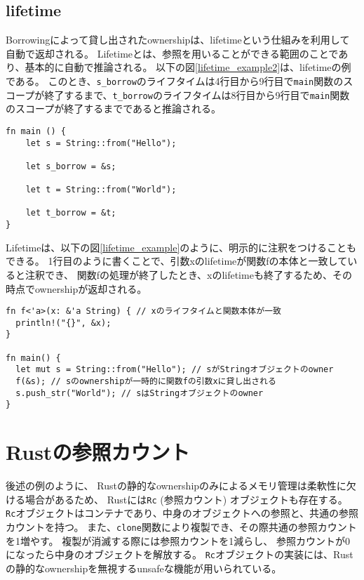 \documentclass{sumiilab-paper}
\theoremstyle{mystyle}
\numberwithin{definition}{chapter} %
\begin{document}
\subsection{lifetime}
Borrowingによって貸し出されたownershipは、lifetimeという仕組みを利用して自動で返却される。
Lifetimeとは、参照を用いることができる範囲のことであり、基本的に自動で推論される。
以下の図\ref{lifetime_example2}は、lifetimeの例である。
このとき、\texttt{s\_borrow}のライフタイムは4行目から9行目で\texttt{main}関数のスコープが終了するまで、\texttt{t\_borrow}のライフタイムは8行目から9行目で\texttt{main}関数のスコープが終了するまでであると推論される。
\begin{lstlisting}[caption=Lifetimeの例, label=lifetime_example2, captionpos=b]
fn main () {
    let s = String::from("Hello");

    let s_borrow = &s;

    let t = String::from("World");

    let t_borrow = &t;
}
\end{lstlisting}
Lifetimeは、以下の図\ref{lifetime_example}のように、明示的に注釈をつけることもできる。
1行目のように書くことで、引数xのlifetimeが関数fの本体と一致していると注釈でき、
関数fの処理が終了したとき、xのlifetimeも終了するため、その時点でownershipが返却される。
\begin{lstlisting}[caption=Lifetime注釈, label=lifetime_example, captionpos=b]
fn f<'a>(x: &'a String) { // xのライフタイムと関数本体が一致
  println!("{}", &x);
}

fn main() {
  let mut s = String::from("Hello"); // sがStringオブジェクトのowner
  f(&s); // sのownershipが一時的に関数fの引数xに貸し出される
  s.push_str("World"); // sはStringオブジェクトのowner
}
\end{lstlisting}

\section{Rustの参照カウント}
後述の例のように、
Rustの静的なownershipのみによるメモリ管理は柔軟性に欠ける場合があるため、
Rustには\texttt{Rc} (参照カウント) オブジェクトも存在する。
\texttt{Rc}オブジェクトはコンテナであり、中身のオブジェクトへの参照と、共通の参照カウントを持つ。
また、\texttt{clone}関数により複製でき、その際共通の参照カウントを1増やす。
複製が消滅する際には参照カウントを1減らし、
参照カウントが0になったら中身のオブジェクトを解放する。
\texttt{Rc}オブジェクトの実装には、Rustの静的なownershipを無視するunsafeな機能が用いられている。
\end{document}
